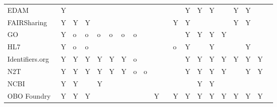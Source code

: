 \begin{table}
\begin{tabular}{llllllllllllllllllll}
                   EDAM~\cite{Ison2013} &              Y &          &       &            &            &          &                &               &         &         &         &                          Y &         Y &                 Y &                    &             Y &               Y &                &               \\
         FAIRSharing~\cite{Sansone2019} &              Y &        Y &     Y &            &            &          &                &               &         &         &       Y &                          Y &           &                   &                    &             Y &               Y &                &               \\
GO~\cite{TheGeneOntologyConsortium2019} &              Y &        o &     o &          o &          o &        o &              o &               &         &         &         &                          Y &         Y &                 Y &                  Y &               &                 &                &               \\
                  HL7~\cite{Bender2013} &              Y &        o &     o &            &            &          &                &               &         &         &       o &                          Y &           &                 Y &                    &               &               Y &                &               \\
        Identifiers.org~\cite{Juty2012} &              Y &        Y &     Y &          Y &          Y &        Y &              o &               &         &         &         &                          Y &         Y &                 Y &                  Y &             Y &               Y &              Y &               \\
             N2T~\cite{Wimalaratne2018} &              Y &        Y &     Y &          Y &          Y &        Y &              o &             o &         &         &         &                          Y &         Y &                 Y &                  Y &               &               Y &              Y &               \\
                  NCBI~\cite{Clark2016} &              Y &        Y &       &          Y &            &          &                &               &         &         &         &                            &         Y &                 Y &                    &               &                 &                &               \\
         OBO Foundry~\cite{Jackson2021} &              Y &        Y &     Y &            &            &          &                &               &       Y &         &       Y &                          Y &         Y &                 Y &                  Y &             Y &               Y &              Y &               \\

\end{tabular}
\end{table}
